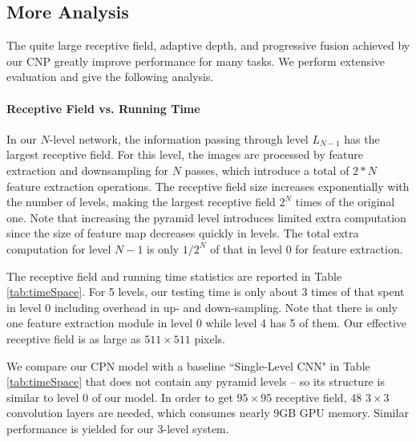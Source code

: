 \documentclass[10pt,twocolumn,letterpaper]{article}
\begin{document}
\subsection{More Analysis}\label{sec:analysis}

The quite large receptive field, adaptive depth, and progressive fusion achieved by our
CNP greatly improve performance for many tasks. We perform extensive evaluation and give
the following analysis.


\vspace{-0.1in}\paragraph{Receptive Field vs. Running Time~~} In our $N$-level network,
the information passing through level $L_{N-1}$ has the largest receptive field. For this
level, the images are processed by feature extraction and downsampling for $N$ passes,
which introduce a total of $2*N$ feature extraction operations. The receptive field size
increases exponentially with the number of levels, making the largest receptive field
$2^N$ times of the original one. Note that increasing the pyramid level introduces
limited extra computation since the size of feature map decreases quickly in levels. The
total extra computation for level ${N-1}$ is only $1/2^N$ of that in level $0$ for
feature extraction.

The receptive field and running time statistics are reported in Table
\ref{tab:timeSpace}. For 5 levels, our testing time is only about 3 times of that spent
in level 0 including overhead in up- and down-sampling. Note that there is only one
feature extraction module in level 0 while level 4 has 5 of them. Our effective receptive
field is as large as $511\times511$ pixels.

We compare our CPN model with a baseline ``Single-Level CNN" in Table \ref{tab:timeSpace}
that does not contain any pyramid levels -- so its structure is similar to level 0 of our
model. In order to get $95\times95$ receptive field, 48 $3 \times 3$ convolution layers
are needed, which consumes nearly 9GB GPU memory. Similar performance is yielded for our
3-level system.
\end{document}
